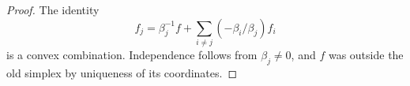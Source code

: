 \begin{proof}
The identity
\[
 f_j=\beta_j^{-1}f+
       \sum_{i\ne j}(-\beta_i/\beta_j)f_i
\]
is a convex combination. Independence follows from $\beta_j\ne0$,
and $f$ was outside the old simplex by uniqueness of its coordinates.
\end{proof}
